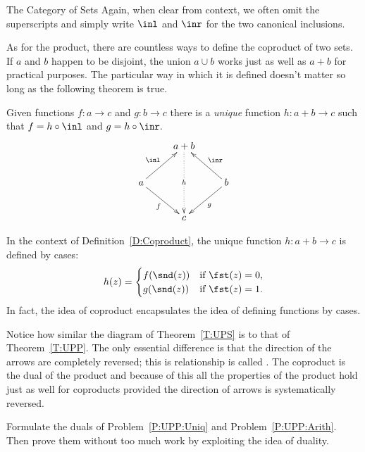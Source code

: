\begin{unit}{The Category of Sets}
\noindent
Again, when clear from context, we often omit the superscripts and simply write \(\inl\) and \(\inr\) for the two canonical inclusions.

As for the product, there are countless ways to define the coproduct of two sets.
If \(a\) and \(b\) happen to be disjoint, the union \(a \cup b\) works just as well as \(a + b\) for practical purposes.
The particular way in which it is defined doesn't matter so long as the following theorem is true.

\begin{theorem}\label{T:UPS}
  Given functions \(f: a \to c\) and \(g: b \to c\) there is a \emph{unique} function \(h: a + b \to c\) such that \(f = h \circ \inl\) and \(g = h \circ \inr.\)
  \[\xymatrix{
    & a + b \ar@{.>}[dd]|{h} \\
    a \ar[ur]^-{\inl} \ar[dr]_-{f} & & b \ar[ul]_-{\inr} \ar[dl]^-{g} \\
    & c 
  }\]
\end{theorem}

\noindent
In the context of Definition~\ref{D:Coproduct}, the unique function \(h:a + b \to c\) is defined by cases: \[h(z) = \begin{cases} 
  f(\snd(z)) & \text{if $\fst(z) = 0$,} \\
  g(\snd(z)) & \text{if $\fst(z) = 1$.}
\end{cases}\]
In fact, the idea of coproduct encapsulates the idea of defining functions by cases.

Notice how similar the diagram of Theorem~\ref{T:UPS} is to that of Theorem~\ref{T:UPP}.
The only essential difference is that the direction of the arrows are completely reversed; this is relationship is called .
The coproduct is the dual of the product and because of this all the properties of the product hold just as well for coproducts provided the direction of arrows is systematically reversed.

\begin{problem}
  Formulate the duals of Problem~\ref{P:UPP:Uniq} and Problem~\ref{P:UPP:Arith}.
  Then prove them without too much work by exploiting the idea of duality.
\end{problem}



\end{unit}
